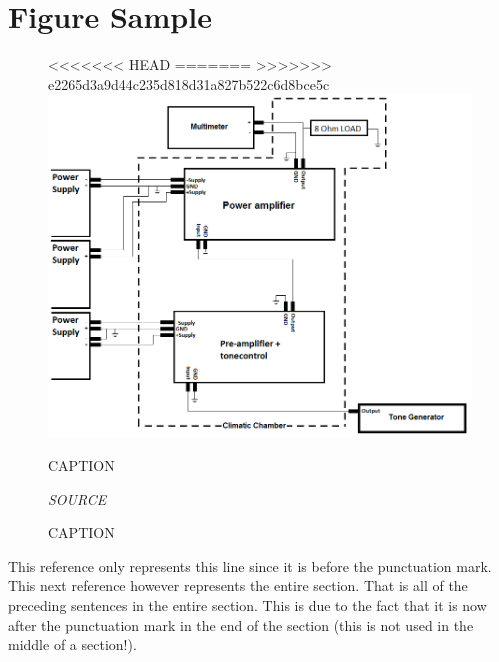 \section{Figure Sample}

\begin{figure}[H]
<<<<<<< HEAD
	\label{LABEL}
=======
>>>>>>> e2265d3a9d44c235d818d31a827b522c6d8bce5c
	\centering
	\includegraphics[scale=.6]{figures/filename}
	\caption{CAPTION}
	\label{LABEL}
	\flushleft
	\caption{CAPTION}
	\textit{SOURCE}
\end{figure}


 

\vspace{.5cm}
\noindent
This reference only represents this line since it is before the punctuation mark\cite{YDing}. This next reference however represents the entire section. That is all of the preceding sentences in the entire section. This is due to the fact that it is now after the punctuation mark in the end of the section (this is not used in the middle of a section!).\cite{YDing}
\pagebreak